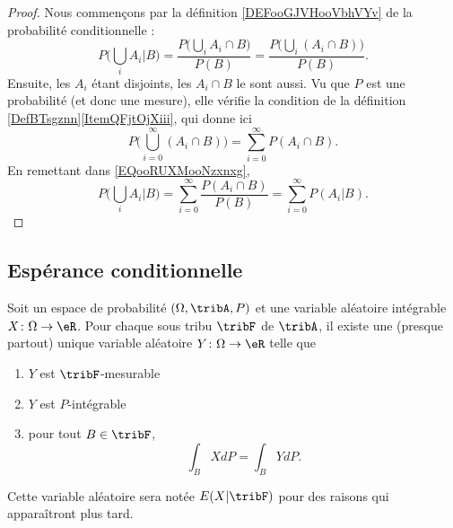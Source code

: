 \begin{proof}
    Nous commençons par la définition \ref{DEFooGJVHooVbhVYv} de la probabilité conditionnelle :
    \begin{equation}        \label{EQooRUXMooNzxnxg}
        P\big( \bigcup_iA_i|B \big)=\frac{ P\big( \bigcup_iA_i\cap B \big) }{ P(B) }=\frac{ P\big( \bigcup_i(A_i\cap B) \big) }{ P(B) }.
    \end{equation}
    Ensuite, les \( A_i\) étant disjoints, les \( A_i\cap B\) le sont aussi. Vu que \( P\) est une probabilité (et donc une mesure), elle vérifie la condition de la définition \ref{DefBTsgznn}\ref{ItemQFjtOjXiii}, qui donne ici
    \begin{equation}
        P\big( \bigcup_{i=0}^{\infty}(A_i\cap B) \big)=\sum_{i=0}^{\infty}P(A_i\cap B).
    \end{equation}
    En remettant dans \eqref{EQooRUXMooNzxnxg},
    \begin{equation}     
        P\big( \bigcup_iA_i|B \big)=\sum_{i=0}^{\infty}\frac{ P(A_i\cap B) }{ P(B) }=\sum_{i=0}^{\infty}P(A_i|B).
    \end{equation}
\end{proof}

\subsection{Espérance conditionnelle}

\begin{theoremDef}     \label{ThoMWfDPQ}
    Soit un espace de probabilité \( (\Omega,\tribA,P)\) et une variable aléatoire intégrable \( X\colon \Omega\to \eR\). Pour chaque sous tribu \( \tribF\) de \( \tribA\), il existe une (presque partout) unique variable aléatoire \( Y\colon \Omega\to \eR\) telle que
    \begin{enumerate}
        \item
            \( Y\) est \( \tribF\)-mesurable
        \item
            \( Y\) est \( P\)-intégrable
        \item
            pour tout \( B\in\tribF\),
            \begin{equation}        \label{EqBwBkgE}
                \int_{B}XdP=\int_B YdP.
            \end{equation}
    \end{enumerate}
    Cette variable aléatoire sera notée \( E(X|\tribF)\) pour des raisons qui apparaîtront plus tard.
\end{theoremDef}

